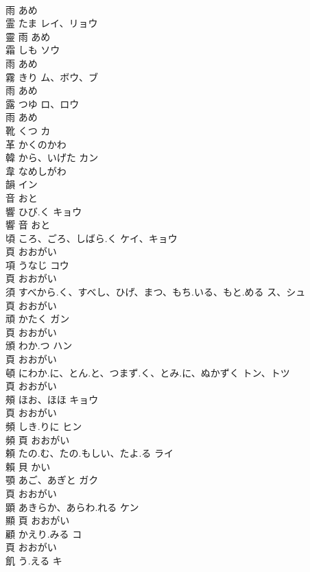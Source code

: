 \documentclass[8pt]{extreport}
\begin{document}
\begin{CJK}{UTF8}{min}
\\	雨		あめ		
\\	霊	たま	レイ、リョウ	
\\	靈	雨		あめ		
\\	霜	しも	ソウ	
\\	雨		あめ		
\\	霧	きり	ム、ボウ、ブ	
\\	雨		あめ		
\\	露	つゆ	ロ、ロウ	
\\	雨		あめ		
\\	靴	くつ	カ	
\\	革		かくのかわ		
\\	韓	から、いげた	カン	
\\	韋		なめしがわ		
\\	韻		イン	
\\	音		おと		
\\	響	ひび.く	キョウ	
\\	響	音		おと		
\\	頃	ころ、ごろ、しばら.く	ケイ、キョウ	
\\	頁		おおがい		
\\	項	うなじ	コウ	
\\	頁		おおがい		
\\	須	すべから.く、すべし、ひげ、まつ、もち.いる、もと.める	ス、シュ	
\\	頁		おおがい		
\\	頑	かたく	ガン	
\\	頁		おおがい		
\\	頒	わか.つ	ハン	
\\	頁		おおがい		
\\	頓	にわか.に、とん.と、つまず.く、とみ.に、ぬかずく	トン、トツ	
\\	頁		おおがい		
\\	頰	ほお、ほほ	キョウ	
\\	頁		おおがい		
\\	頻	しき.りに	ヒン	
\\	頻	頁		おおがい		
\\	頼	たの.む、たの.もしい、たよ.る	ライ	
\\	賴	貝		かい		
\\	顎	あご、あぎと	ガク	
\\	頁		おおがい		
\\	顕	あきらか、あらわ.れる	ケン	
\\	顯	頁		おおがい		
\\	顧	かえり.みる	コ	
\\	頁		おおがい		
\\	飢	う.える	キ	

\end{CJK}
\end{document}
